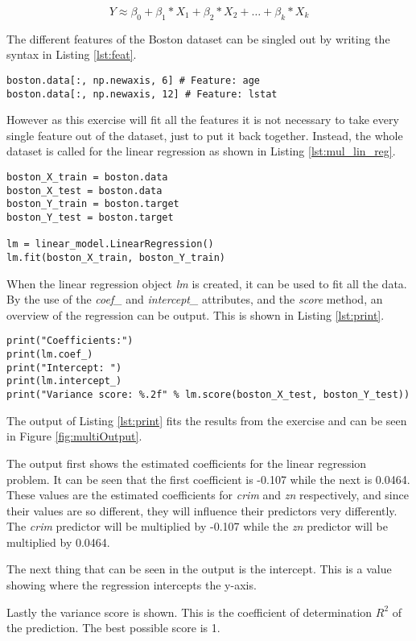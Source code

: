 \begin{equation}
Y \approx \beta_0 + \beta_1 * X_1 + \beta_2 * X_2 + … + \beta_k * X_k
\end{equation}

The different features of the Boston dataset can be singled out by writing the syntax in Listing \ref{lst:feat}. 

\begin{lstlisting}[caption={Boston features}, label=lst:feat, mathescape=true]
boston.data[:, np.newaxis, 6] # Feature: age
boston.data[:, np.newaxis, 12] # Feature: lstat
\end{lstlisting}

However as this exercise will fit all the features it is not necessary to take every single feature out of the dataset, just to put it back together. Instead, the whole dataset is called for the linear regression as shown in Listing \ref{lst:mul_lin_reg}.

\begin{lstlisting}[caption={Linear Regression of multiple predictors}, label=lst:mul_lin_reg, mathescape=true]
boston_X_train = boston.data
boston_X_test = boston.data
boston_Y_train = boston.target
boston_Y_test = boston.target

lm = linear_model.LinearRegression()
lm.fit(boston_X_train, boston_Y_train)
\end{lstlisting}

When the linear regression object \emph{lm} is created, it can be used to fit all the data. By the use of the \emph{coef\_} and \emph{intercept\_} attributes, and the \emph{score} method, an overview of the regression can be output. This is shown in Listing \ref{lst:print}.

\begin{lstlisting}[caption={Printing regression overview}, label=lst:print, mathescape=true]
print("Coefficients:")
print(lm.coef_)
print("Intercept: ")
print(lm.intercept_)
print("Variance score: %.2f" % lm.score(boston_X_test, boston_Y_test))
\end{lstlisting}

The output of Listing \ref{lst:print} fits the results from the exercise and can be seen in Figure \ref{fig:multiOutput}.


The output first shows the estimated coefficients for the linear regression problem. It can be seen that the first coefficient is -0.107 while the next is 0.0464. These values are the estimated coefficients for \emph{crim} and \emph{zn} respectively, and since their values are so different, they will influence their predictors very differently. The \emph{crim} predictor will be multiplied by -0.107 while the \emph{zn} predictor will be multiplied by 0.0464. 

The next thing that can be seen in the output is the intercept. This is a value showing where the regression intercepts the y-axis. 

Lastly the variance score is shown. This is the coefficient of determination $R^2$ of the prediction. The best possible score is 1. 
